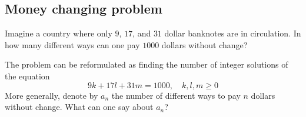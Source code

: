 

\setcounter{section}{3}
\setcounter{subsection}{1}
\setcounter{dfn}{0}

\subsection{Money changing problem}
Imagine a country where only $9$, $17$, and $31$ dollar banknotes are in circulation.
In how many different ways can one pay $1000$ dollars without change?

The problem can be reformulated as finding the number of integer solutions of the equation
\[
9k + 17l + 31m = 1000, \quad k, l, m \ge 0
\]
More generally, denote by $a_n$ the number of different ways to pay $n$ dollars without change.
What can one say about $a_n$?


